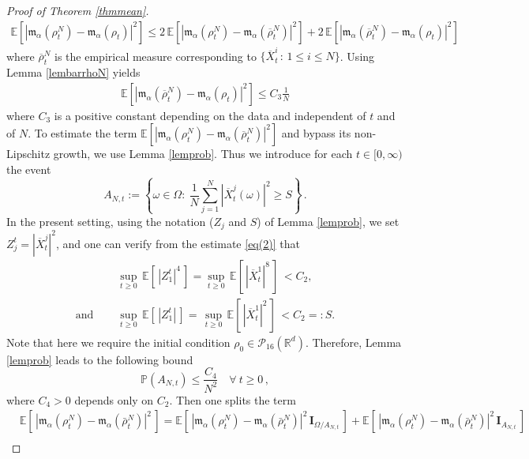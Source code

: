 \documentclass[12pt]{amsart}
\newcommand{\RR}{{\mathbb R}}
\newcommand{\EE}{{\mathbb E}}
\newcommand{\mm}{{\mathfrak{m}}}
\newcommand{\OX}{{\overline{X}}}
\numberwithin{equation}{section}
\begin{document}
\begin{proof}[Proof of Theorem \ref{thmmean}]
\begin{align*}
    \EE\left[|\mathfrak{m}_{\alpha}(\rho^{N}_{t}) - \mathfrak{m}_{\alpha}(\rho_{t})|^{2}\right] \leq 2\,  \EE\left[|\mathfrak{m}_{\alpha}(\rho^{N}_{t}) - \mathfrak{m}_{\alpha}(\overline{\rho}^{N}_{t})|^{2}\right] + 2\,\EE\left[|\mathfrak{m}_{\alpha}(\overline{\rho}^{N}_{t}) - \mathfrak{m}_{\alpha}(\rho_{t})|^{2}\right] 
\end{align*}
where $\overline{\rho}^{N}_{t}$ is the empirical measure corresponding to $\{\overline{X}^{i}_{t}\, : \, 1\leq i \leq N\}$. Using Lemma \ref{lembarrhoN} yields 
\begin{align*}
    \EE\left[|\mathfrak{m}_{\alpha}(\overline{\rho}^{N}_{t}) - \mathfrak{m}_{\alpha}(\rho_{t})|^{2}\right] \leq C_{3}\frac{1}{N}
\end{align*}
where $C_{3}$ is a positive constant depending on the data and independent of $t$ and of $N$. To estimate the term $\EE\left[|\mathfrak{m}_{\alpha}(\rho^{N}_{t}) - \mathfrak{m}_{\alpha}(\overline{\rho}^{N}_{t})|^{2}\right]$ and bypass its non-Lipschitz growth, we use Lemma \ref{lemprob}. Thus we introduce for each $t\in[0,\infty)$ the event 
\begin{equation}
    A_{N,t}:=\left\{\omega\in\Omega:~\frac{1}{N}\sum_{j=1}^N|\OX_t^j (\omega)|^2\geq S\right\}\,.
\end{equation}
In the present setting, using the notation ($Z_{j}$ and $S$) of Lemma \ref{lemprob},  we set  $Z_j^t=|\OX_t^j|^2$, and one can verify from the estimate \eqref{eq(2)} that 
\begin{align*}
    & \sup_{t\geq 0}\,\EE[\,|Z_1^t|^4\,]= \sup_{t\geq 0}\,\EE[\,|\OX_t^1|^8\,]\,<C_2 ,\\
    \text{and } \quad & \sup_{t\geq 0}\,\EE[\,|Z_1^t|\,]= \,\sup_{t\geq 0}\,\EE[\,|\OX_t^1|^2\,] \,<C_2=:S. 
\end{align*}
Note that here we require the initial condition $\rho_0\in\mathscr{P}_{16}(\RR^d)$.
Therefore, Lemma \ref{lemprob}  leads to the following bound
\begin{equation}
    \mathbb{P}(A_{N,t})\leq \frac{C_4}{N^2}\quad \forall~t\geq 0 \,,
\end{equation}
where $C_4>0$ depends only on $C_2$.
Then one splits the term
\begin{align*}
    & \EE[\,|\mm_\alpha(\rho_t^{N})-\mm_\alpha(\bar \rho_t^N)|^2\,] =\EE[\,|\mm_\alpha(\rho_t^{N})-\mm_\alpha(\bar \rho_t^N)|^2\,\textbf{I}_{\Omega /A_{N,t}}\,]+\EE[\,|\mm_\alpha(\rho_t^{N})-\mm_\alpha(\bar \rho_t^N)|^2\,\textbf{I}_{A_{N,t}}\,] \\

\end{align*}
\end{proof}
\end{document}
